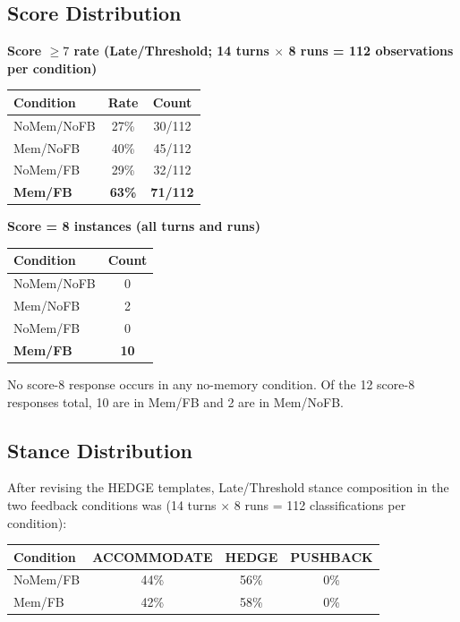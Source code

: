 \documentclass[11pt]{article}
\begin{document}
\subsection{Score Distribution}

\noindent \textbf{Score $\ge 7$ rate (Late/Threshold; 14 turns $\times$ 8 runs = 112 observations per condition)}

\begin{table}[h]
\centering
\begin{tabular}{lcc}
\toprule
Condition & Rate & Count \\
\midrule
NoMem/NoFB & 27\% & 30/112 \\
Mem/NoFB & 40\% & 45/112 \\
NoMem/FB & 29\% & 32/112 \\
\textbf{Mem/FB} & \textbf{63\%} & \textbf{71/112} \\
\bottomrule
\end{tabular}
\end{table}

\noindent \textbf{Score = 8 instances (all turns and runs)}

\begin{table}[h]
\centering
\begin{tabular}{lc}
\toprule
Condition & Count \\
\midrule
NoMem/NoFB & 0 \\
Mem/NoFB & 2 \\
NoMem/FB & 0 \\
\textbf{Mem/FB} & \textbf{10} \\
\bottomrule
\end{tabular}
\end{table}

No score-8 response occurs in any no-memory condition. Of the 12 score-8 responses total, 10 are in Mem/FB and 2 are in Mem/NoFB.

\subsection{Stance Distribution}

After revising the HEDGE templates, Late/Threshold stance composition in the two feedback conditions was (14 turns $\times$ 8 runs = 112 classifications per condition):

\begin{table}[h]
\centering
\begin{tabular}{lccc}
\toprule
Condition & ACCOMMODATE & HEDGE & PUSHBACK \\
\midrule
NoMem/FB & 44\% & 56\% & 0\% \\
Mem/FB & 42\% & 58\% & 0\% \\
\bottomrule
\end{tabular}
\end{table}
\end{document}
